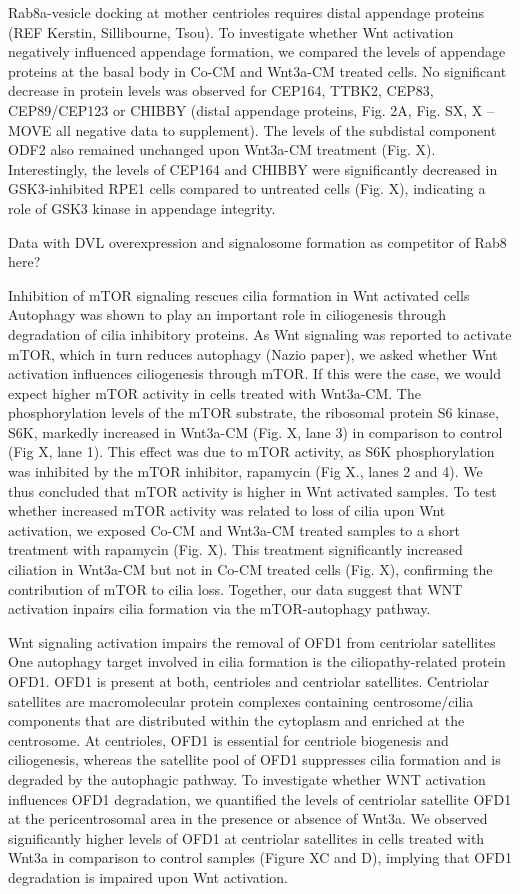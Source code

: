 \documentclass[
  11pt,
]{article}
\begin{document}
Rab8a-vesicle docking at mother centrioles requires distal appendage
proteins (REF Kerstin, Sillibourne, Tsou). To investigate whether Wnt
activation negatively influenced appendage formation, we compared the
levels of appendage proteins at the basal body in Co-CM and Wnt3a-CM
treated cells. No significant decrease in protein levels was observed
for CEP164, TTBK2, CEP83, CEP89/CEP123 or CHIBBY (distal appendage
proteins, Fig. 2A, Fig. SX, X -- MOVE all negative data to supplement).
The levels of the subdistal component ODF2 also remained unchanged upon
Wnt3a-CM treatment (Fig. X). Interestingly, the levels of CEP164 and
CHIBBY were significantly decreased in GSK3-inhibited RPE1 cells
compared to untreated cells (Fig. X), indicating a role of GSK3 kinase
in appendage integrity.

Data with DVL overexpression and signalosome formation as competitor of
Rab8 here?

Inhibition of mTOR signaling rescues cilia formation in Wnt activated
cells Autophagy was shown to play an important role in ciliogenesis
through degradation of cilia inhibitory proteins. As Wnt signaling was
reported to activate mTOR, which in turn reduces autophagy (Nazio
paper), we asked whether Wnt activation influences ciliogenesis through
mTOR. If this were the case, we would expect higher mTOR activity in
cells treated with Wnt3a-CM. The phosphorylation levels of the mTOR
substrate, the ribosomal protein S6 kinase, S6K, markedly increased in
Wnt3a-CM (Fig. X, lane 3) in comparison to control (Fig X, lane 1). This
effect was due to mTOR activity, as S6K phosphorylation was inhibited by
the mTOR inhibitor, rapamycin (Fig X., lanes 2 and 4). We thus concluded
that mTOR activity is higher in Wnt activated samples. To test whether
increased mTOR activity was related to loss of cilia upon Wnt
activation, we exposed Co-CM and Wnt3a-CM treated samples to a short
treatment with rapamycin (Fig. X). This treatment significantly
increased ciliation in Wnt3a-CM but not in Co-CM treated cells (Fig. X),
confirming the contribution of mTOR to cilia loss. Together, our data
suggest that WNT activation inpairs cilia formation via the
mTOR-autophagy pathway.

Wnt signaling activation impairs the removal of OFD1 from centriolar
satellites One autophagy target involved in cilia formation is the
ciliopathy-related protein OFD1. OFD1 is present at both, centrioles and
centriolar satellites. Centriolar satellites are macromolecular protein
complexes containing centrosome/cilia components that are distributed
within the cytoplasm and enriched at the centrosome. At centrioles, OFD1
is essential for centriole biogenesis and ciliogenesis, whereas the
satellite pool of OFD1 suppresses cilia formation and is degraded by the
autophagic pathway. To investigate whether WNT activation influences
OFD1 degradation, we quantified the levels of centriolar satellite OFD1
at the pericentrosomal area in the presence or absence of Wnt3a. We
observed significantly higher levels of OFD1 at centriolar satellites in
cells treated with Wnt3a in comparison to control samples (Figure XC and
D), implying that OFD1 degradation is impaired upon Wnt activation.
\end{document}
